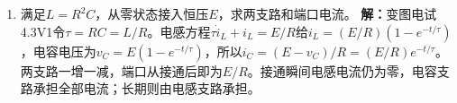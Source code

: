 \documentclass[UTF8,fontset=fandol,a4paper,11pt]{ctexart}
\begin{document}
\begin{enumerate}
\item 满足$L=R^2C$，从零状态接入恒压$E$，求两支路和端口电流。
\textbf{解：}变图电试4.3V1令$\tau=RC=L/R$。电感方程$\tau\dot i_L+i_L=E/R$给$i_L=(E/R)(1-e^{-t/\tau})$，电容电压为$v_C=E(1-e^{-t/\tau})$，所以$i_C=(E-v_C)/R=(E/R)e^{-t/\tau}$。两支路一增一减，端口从接通后即为$E/R$。接通瞬间电感电流仍为零，电容支路承担全部电流；长期则由电感支路承担。
\begin{center}\begin{minipage}{.98\linewidth}\centering
{}
\end{minipage}
\end{center}
\end{enumerate}
\end{document}
